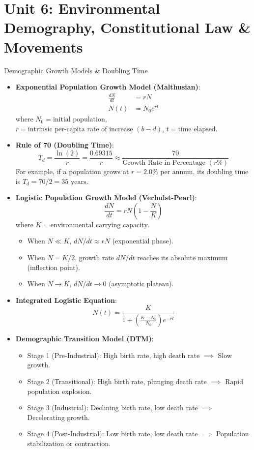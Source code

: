 \chapter{Unit 6: Environmental Demography, Constitutional Law \& Movements}

\begin{formulabox}{Demographic Growth Models \& Doubling Time}
\begin{itemize}[leftmargin=1.2em]
    \item \textbf{Exponential Population Growth Model (Malthusian)}:
    \begin{align}
    \frac{dN}{dt} &= rN \\
    N(t) &= N_0 e^{rt}
    \end{align}
    where $N_0 = \text{initial population}$, $r = \text{intrinsic per-capita rate of increase } (b - d)$, $t = \text{time elapsed}$.
    \item \textbf{Rule of 70 (Doubling Time)}:
    \begin{equation}
    T_d = \frac{\ln(2)}{r} = \frac{0.69315}{r} \approx \frac{70}{\text{Growth Rate in Percentage } (r\%)}
    \end{equation}
    For example, if a population grows at $r = 2.0\%$ per annum, its doubling time is $T_d = 70 / 2 = 35\text{ years}$.
    \item \textbf{Logistic Population Growth Model (Verhulst-Pearl)}:
    \begin{equation}
    \frac{dN}{dt} = rN \left(1 - \frac{N}{K}\right)
    \end{equation}
    where $K = \text{environmental carrying capacity}$.
    \begin{itemize}
        \item When $N \ll K$, $dN/dt \approx rN$ (exponential phase).
        \item When $N = K/2$, growth rate $dN/dt$ reaches its absolute maximum (inflection point).
        \item When $N \to K$, $dN/dt \to 0$ (asymptotic plateau).
    \end{itemize}
    \item \textbf{Integrated Logistic Equation}:
    \begin{equation}
    N(t) = \frac{K}{1 + \left(\frac{K - N_0}{N_0}\right) e^{-rt}}
    \end{equation}
    \item \textbf{Demographic Transition Model (DTM)}:
    \begin{itemize}
        \item Stage 1 (Pre-Industrial): High birth rate, high death rate $\implies$ Slow growth.
        \item Stage 2 (Transitional): High birth rate, plunging death rate $\implies$ Rapid population explosion.
        \item Stage 3 (Industrial): Declining birth rate, low death rate $\implies$ Decelerating growth.
        \item Stage 4 (Post-Industrial): Low birth rate, low death rate $\implies$ Population stabilization or contraction.
    \end{itemize}
\end{itemize}
\end{formulabox}

